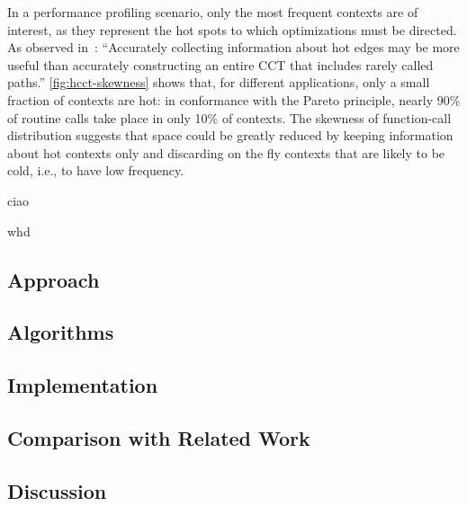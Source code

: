 In a performance profiling scenario, only the most frequent contexts are of interest, as they represent the hot spots to which optimizations must be directed. As observed in~\cite{Zhuang06}: ``Accurately collecting information about hot edges may be more useful than accurately constructing an entire CCT that includes rarely called paths.'' \myfigure\ref{fig:hcct-skewness} shows that, for different applications, only a small fraction of contexts are hot: in conformance with the Pareto principle, nearly 90\% of routine calls take place in only 10\% of contexts. The skewness of function-call distribution suggests that space could be greatly reduced by keeping information about hot contexts only and discarding on the fly contexts that are likely to be cold, i.e., to have low frequency.

\ifdefined\noauthorea
ciao
\fi

\ifx\noauthorea\undefined
whd
\fi



\subsection{Approach}

\subsection{Algorithms}

\subsection{Implementation}

\subsection{Comparison with Related Work}

\subsection{Discussion}
